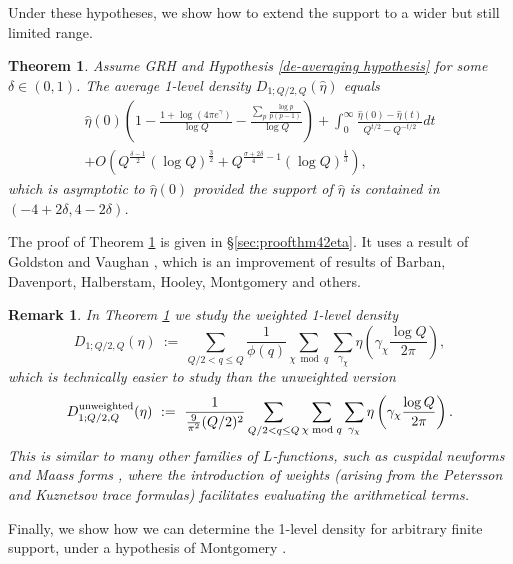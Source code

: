\documentclass[12pt,reqno]{amsart}
\numberwithin{equation}{section}
\theoremstyle{plain}
\newtheorem{theorem}[thm]{Theorem}
\newtheorem{remark}[thm]{Remark}
\begin{document}

Under these hypotheses, we show how to extend the support to a wider but still limited range.

\begin{theorem}
Assume GRH and Hypothesis \ref{de-averaging hypothesis} for some $\delta \in (0,1)$. The average 1-level density $D_{1;Q/2,Q}({\widehat{\eta}})$ equals
\begin{multline} \hat{\eta}(0) \left( 1-\frac{1+\log(4\pi e^{\gamma})}{\log Q} -\frac{\sum_p \frac{\log p}{p(p-1)}}{\log Q}\right)+\int_0^{\infty}\frac{{\widehat{\eta}}(0)-{\widehat{\eta}}(t)}{Q^{t/2}-Q^{-t/2}} dt  \\
+O(Q^{\frac{\delta-1}2} (\log Q)^{\frac 32}+Q^{\frac{\sigma+2\delta}4-1} (\log Q)^{\frac 13}),
\label{equation thm 4-2eta}
\end{multline}
which is asymptotic to ${\widehat{\eta}}(0)$ provided the support of ${\widehat{\eta}}$ is contained in $(-4+2\delta,4-2\delta)$.
\label{thm 4-2eta}
\end{theorem}

The proof of Theorem \ref{thm 4-2eta} is given in \S\ref{sec:proofthm42eta}. It uses a result of Goldston and Vaughan \cite{GV}, which is an improvement of results of Barban, Davenport, Halberstam, Hooley, Montgomery and others.

\begin{remark}  In Theorem \ref{thm 4-2eta} we study the weighted 1-level density
\begin{equation} D_{1;Q/2,Q}(\eta) \ := \    \sum_{Q/2<q\leq Q}\frac 1{\phi(q)}\sum_{\chi \bmod q} \sum_{\gamma_{\chi}} \eta\left(
\gamma_{\chi} \frac{\log Q}{2\pi} \right), \end{equation} which is technically easier to study than the unweighted version
\begin{equation} D_{1;Q/2,Q}^{\rm unweighted}(\eta) \ := \ \frac 1{\frac 9{\pi^2}(Q/2)^2} \sum_{Q/2<q\leq Q}\sum_{\chi \bmod q} \sum_{\gamma_{\chi}} \eta\left(
\gamma_{\chi} \frac{\log Q}{2\pi} \right).
\end{equation}
This is similar to many other families of $L$-functions, such as cuspidal newforms \cite{ILS,MilMo} and Maass forms \cite{AAILMZ,AM}, where the introduction of weights (arising from the Petersson and Kuznetsov trace formulas) facilitates evaluating the arithmetical terms.
\end{remark}

Finally, we show how we can determine the 1-level density for arbitrary finite support, under a hypothesis of Montgomery \cite{Mon1}.
\end{document}
